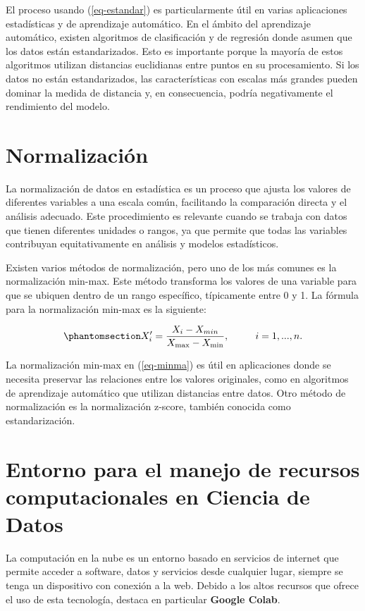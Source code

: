 \documentclass[
  us-letterpaper,
]{scrreprt}
\theoremstyle{plain}
\theoremstyle{definition}
\theoremstyle{definition}
\theoremstyle{remark}
\begin{document}
El proceso usando (\ref{eq-estandar}) es particularmente útil en varias
aplicaciones estadísticas y de aprendizaje automático. En el ámbito del
aprendizaje automático, existen algoritmos de clasificación y de
regresión donde asumen que los datos están estandarizados. Esto es
importante porque la mayoría de estos algoritmos utilizan distancias
euclidianas entre puntos en su procesamiento. Si los datos no están
estandarizados, las características con escalas más grandes pueden
dominar la medida de distancia y, en consecuencia, podría negativamente
el rendimiento del modelo.

\section{Normalización}\label{normalizaciuxf3n}

La normalización de datos en estadística es un proceso que ajusta los
valores de diferentes variables a una escala común, facilitando la
comparación directa y el análisis adecuado. Este procedimiento es
relevante cuando se trabaja con datos que tienen diferentes unidades o
rangos, ya que permite que todas las variables contribuyan
equitativamente en análisis y modelos estadísticos.

Existen varios métodos de normalización, pero uno de los más comunes es
la normalización min-max. Este método transforma los valores de una
variable para que se ubiquen dentro de un rango específico, típicamente
entre 0 y 1. La fórmula para la normalización min-max es la siguiente:

\begin{equation}\phantomsection\label{eq-minma}{ X_i^\prime = \dfrac{X_i- X_{min}}{X_{\max} - X_{\min}}, \ \ \ \ \ \ \ \  i=1,...,n.}\end{equation}

La normalización min-max en (\ref{eq-minma}) es útil en aplicaciones
donde se necesita preservar las relaciones entre los valores originales,
como en algoritmos de aprendizaje automático que utilizan distancias
entre datos. Otro método de normalización es la normalización z-score,
también conocida como estandarización.

\section{Entorno para el manejo de recursos computacionales en Ciencia
de Datos}\label{sec-colab}

La computación en la nube es un entorno basado en servicios de internet
que permite acceder a software, datos y servicios desde cualquier lugar,
siempre se tenga un dispositivo con conexión a la web. Debido a los
altos recursos que ofrece el uso de esta tecnología, destaca en
particular \textbf{Google Colab}.
\end{document}
